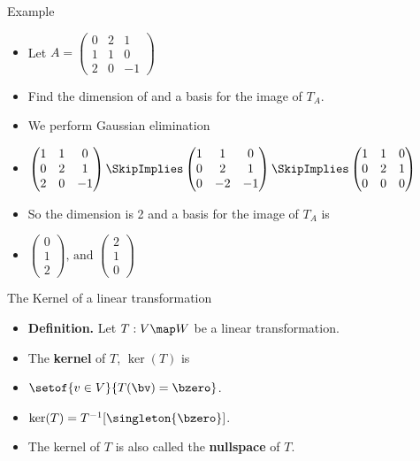 \documentclass{beamer}
\begin{document}

\begin{frame}{Example}

\begin{itemize}
\item Let $A=
\begin{pmatrix}
0 & 2 & 1 \\
1 & 1 & 0 \\
2 & 0 & -1
\end{pmatrix}
$
\item Find the dimension of and a basis for the image of $T_A$.
\item We perform Gaussian elimination
\item $
\begin{pmatrix}
1 & 1 & 0 \\
0 & 2 & 1 \\
2 & 0 & -1
\end{pmatrix}
\SkipImplies
\begin{pmatrix}
1 & 1 & 0 \\
0 & 2 & 1 \\
0 & -2 & -1
\end{pmatrix}
\SkipImplies
\begin{pmatrix}
1 & 1 & 0 \\
0 & 2 & 1 \\
0 & 0 & 0
\end{pmatrix}
$
\item So the dimension is 2 and a basis for the image of $T_A$ is
\item $
\begin{pmatrix}
0 \\
1 \\
2
\end{pmatrix}
\text{, and }
\begin{pmatrix}
2 \\
1 \\
0
\end{pmatrix}
$
\end{itemize}

\end{frame}


\begin{frame}{The Kernel of a linear transformation}

\begin{itemize}
\item \textbf{Definition.} Let $T:V\map W$ be a linear transformation.
\item The \textbf{kernel} of $T$, $\ker(T)$ is
\item $\setof{v\in V}{T(\bv) = \bzero}$.
\item $\ker(T) = T^{-1}[\singleton{\bzero}]$.
\item The kernel of $T$ is also called the \textbf{nullspace} of $T$.
\end{itemize}

\end{frame}
\end{document}
